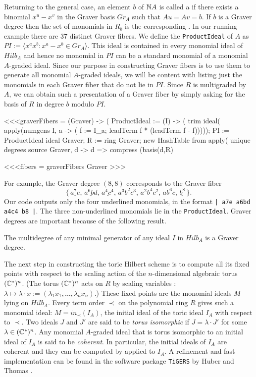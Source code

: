 Returning to the general case, an element $b $ of $\mathbb{N} A$ is called a
{\it {}} if there exists a binomial $x^u - x^v$ in the
Graver basis $Gr_A$ such that $Au = Av = b$. If $b$ is a Graver degree
then the set of monomials in $R_b$ is the corresponding {\it {}}.  In our running example there are $37$ distinct Graver
fibers. We define the {\tt ProductIdeal} of $A$ as $PI := 
\langle x^ax^b : x^a-x^b  \in Gr_A \rangle$. This ideal is contained in
every monomial ideal of $Hilb_A$ and hence no monomial in $PI$ can be
a standard monomial of a monomial $A$-graded ideal. Since our purpose
in constructing Graver fibers is to use them to 
generate all monomial $A$-graded ideals, we will be content with
listing just the monomials in each Graver fiber that do not lie in
$PI$.  Since $R$ is multigraded by $A$, we can obtain such a
presentation of a Graver fiber by simply asking for the basis of $R$
in degree $b$ modulo $PI$.  

<<<graverFibers = (Graver) -> (
     ProductIdeal := (I) -> ( trim ideal(
        apply(numgens I, a -> ( 
            f := I_a; leadTerm f * (leadTerm f - f))))); 
     PI := ProductIdeal ideal Graver; 
     R := ring Graver; 
     new HashTable from apply(
         unique degrees source Graver,
         d -> d => compress (basis(d,R) %

<<<fibers = graverFibers Graver >>>

For example, the Graver degree $(8,8)$ corresponds to the Graver fiber
$$ \bigl\{\,
\underline{a^7 e}, \, \underline{a^6 b d},\,  \underline{a^4 c^4}, \,
a^3 b^2 c^3,\, a^2 b^4 c^2,\,  a b^6 c, \, \underline{b^8} \,\bigr\}.$$
Our \Mtwo code outputs only the four underlined monomials,
in the format {\tt  | a7e a6bd a4c4 b8 |}. The three non-underlined 
monomials lie in the {\tt ProductIdeal}. Graver degrees are
important because of the following result.

\begin{lemma}[{\cite[Lemma 10.5]{HS:St2}}]
The multidegree of any minimal generator of any ideal 
$I$ in $Hilb_A$ is a Graver degree.
\end{lemma}

The next step in constructing the toric Hilbert scheme is to compute
all its fixed points with respect to the scaling action of the
$n$-dimensional algebraic torus $(\mathbb{C}^*)^n$. (The torus $(\mathbb{C}^{\ast})^n$
acts on $R$ by scaling variables : $\lambda \mapsto \lambda \cdot x :=
(\lambda_1 x_1, \ldots, \lambda_n x_n)$.)  These fixed points are the
monomial ideals $M$ lying on $Hilb_A$.  Every term order $\prec$ on
the polynomial ring $R$ gives such a monomial ideal: $M = in_\prec(I_A
)$, the initial ideal of the toric ideal $I_A$ with respect to
$\prec$. Two ideals $J$ and $J'$ are said to be {\em torus
  isomorphic}
if $J = \lambda \cdot J'$ for some $\lambda \in (\mathbb{C}^{\ast})^n$. Any
monomial $A$-graded ideal that is torus isomorphic to an initial ideal
of $I_A$ is said to be {\em coherent}. In particular, the initial
ideals of $I_A$ are coherent and they can be computed by
\cite[Algorithm 3.6]{HS:St2} applied to $I_A$. A refinement and fast
implementation can be found in the software package {\tt TiGERS} by
Huber and Thomas \cite{HS:HT}.

